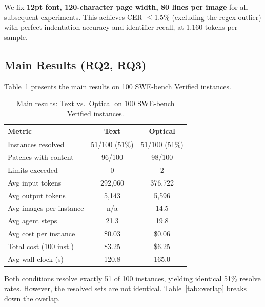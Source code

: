 We fix \textbf{12pt font, 120-character page width, 80 lines per image} for all subsequent experiments. This achieves CER $\le$1.5\% (excluding the regex outlier) with perfect indentation accuracy and identifier recall, at 1{,}160 tokens per sample.


\subsection{Main Results (RQ2, RQ3)}\label{sec:eval-results}

Table~\ref{tab:main-results} presents the main results on 100 SWE-bench Verified instances.

\begin{table}[t]
\centering
\caption{Main results: Text vs.\ Optical on 100 SWE-bench Verified instances.}
\label{tab:main-results}
\small
\begin{tabular}{lcc}
\toprule
\textbf{Metric} & \textbf{Text} & \textbf{Optical} \\
\midrule
Instances resolved       & 51/100 (51\%) & 51/100 (51\%) \\
Patches with content     & 96/100        & 98/100 \\
Limits exceeded          & 0             & 2 \\
\midrule
Avg input tokens         & 292{,}060     & 376{,}722 \\
Avg output tokens        & 5{,}143       & 5{,}596 \\
Avg images per instance  & n/a           & 14.5 \\
Avg agent steps          & 21.3          & 19.8 \\
Avg cost per instance    & \$0.03        & \$0.06 \\
Total cost (100 inst.)   & \$3.25        & \$6.25 \\
Avg wall clock (s)       & 120.8         & 165.0 \\
\bottomrule
\end{tabular}
\end{table}


Both conditions resolve exactly 51 of 100 instances, yielding identical 51\% resolve rates. However, the resolved sets are not identical. Table~\ref{tab:overlap} breaks down the overlap.

